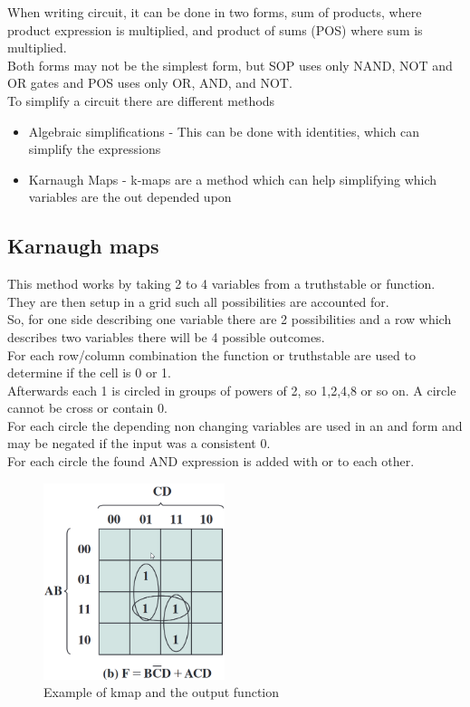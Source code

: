 \documentclass[12pt, a4paper]{article}
\begin{document}
			When writing circuit, it can be done in two forms, sum of products, where product expression is multiplied, and product of sums (POS) where sum is multiplied.\\
			Both forms may not be the simplest form, but SOP uses only NAND, NOT and OR gates and POS uses only OR, AND, and NOT.\\
			To simplify a circuit there are different methods
			\begin{itemize}
				\item Algebraic simplifications - This can be done with identities, which can simplify the expressions
				\item Karnaugh Maps - k-maps are a method which can help simplifying which variables are the out depended upon
			\end{itemize}
			
			\subsection{Karnaugh maps}
				This method works by taking 2 to 4 variables from a truthstable or function. They are then setup in a grid such all possibilities are accounted for.\\
				So, for one side describing one variable there are 2 possibilities and a row which describes two variables there will be 4 possible outcomes.\\
				For each row/column combination the function or truthstable are used to determine if the cell is 0 or 1.\\
				Afterwards each 1 is circled in groups of powers of 2, so 1,2,4,8 or so on. A circle cannot be cross or contain 0.\\
				For each circle the depending non changing variables are used in an and form and may be negated if the input was a consistent 0.\\
				For each circle the found AND expression is added with or to each other.
				\begin{figure}[h!]
					\includegraphics[width=200px]{assets/kmap.png}
					\centering
					\caption{Example of kmap and the output function}
				\end{figure}
\end{document}
